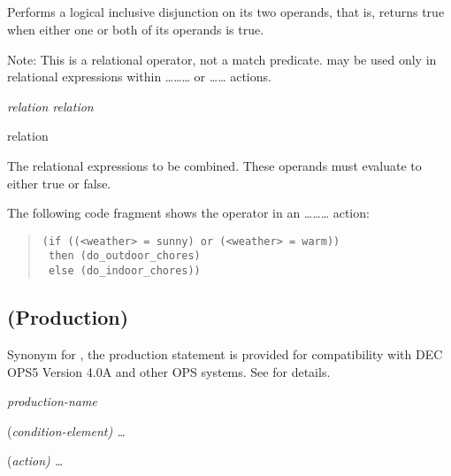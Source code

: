 {{\subsection{}

Performs a logical inclusive disjunction on its two operands,
that is, returns true when either one or both of its operands
is true.

Note: This is a relational operator, not a match predicate.  
may be used only in relational expressions within
\ldots{}\ldots{}\ldots{} or
\ldots{}\ldots{} actions.

\Format

\it{relation}  \it{relation}

\begin{operands}
\item[relation]

  The relational expressions to be combined. These operands must
  evaluate to either true or false.
\end{operands}

\Example

The following code fragment shows the  operator in an
\ldots{}\ldots{}\ldots{} action:
\begin{quote}
\begin{verbatim}
(if ((<weather> = sunny) or (<weather> = warm))
 then (do_outdoor_chores)
 else (do_indoor_chores))
\end{verbatim}
\end{quote}

\subsection{ (Production)}

Synonym for , the production statement is provided for
compatibility with DEC OPS5 Version 4.0A and other OPS
systems. See  for details.

\Format

 \it{production-name} 

\qquad(\it{condition-element}) \dots

\qquad\co{-->}

\qquad(\it{action}) \ldots

\subsection{}

}}

